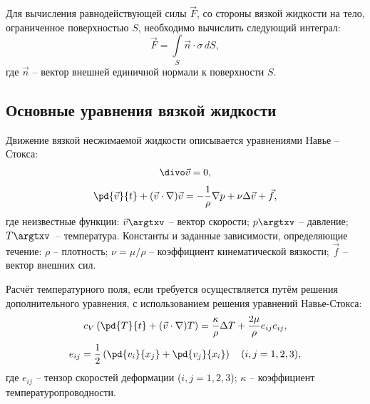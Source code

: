 \documentclass[14pt]{extarticle}
\begin{document}
Для вычисления равнодействующей силы $\vec{F}$, со стороны вязкой жидкости на тело, ограниченное поверхностью $S$, необходимо вычислить следующий интеграл:
\[
\vec{F} = \int\limits_S \vec{n} \cdot \sigma \, dS,
\]
где $\vec{n}$ -- вектор внешней единичной нормали к поверхности $S$.


\subsection{Основные уравнения вязкой жидкости}

Движение вязкой несжимаемой жидкости описывается \alert{уравнениями Навье -- Стокса}:
\begin{equation}
	\label{eq:navier–stokes_mass}
	\divo \vec{v} = 0,
\end{equation}
\begin{equation}
	\label{eq:navier–stokes}
	\pd{\vec{v}}{t} + (\vec{v}\cdot\nabla)\vec{v} = -\frac{1}{\rho}\nabla p + \nu \Delta \vec{v} + \vec{f},
\end{equation}
где \alert{неизвестные функции}: $\vec{v}\argtxv$ -- вектор скорости; $p\argtxv$ -- давление; $T\argtxv$~-- температура. \alert{Константы и заданные зависимости}, определяющие течение: $\rho$ -- плотность; $\nu=\mu/\rho$ -- коэффициент кинематической вязкости; $\vec{f}$ -- вектор внешних сил. 
		
Расчёт температурного поля, если требуется осуществляется путём решения дополнительного уравнения, с использованием решения уравнений Навье-Стокса:
\[
c_V\left(\pd{T}{t} + (\vec{v}\cdot\nabla)T \right) = \frac{\kappa}{\rho} \Delta T + \frac{2\mu}{\rho} e_{ij}e_{ij},
\]
\[
e_{ij} = \frac{1}{2}\left(
\pd{v_i}{x_j}+\pd{v_j}{x_i}
\right)\quad
(i,j = 1,2,3),
\]
где $e_{ij}$ -- тензор скоростей деформации ($i,j = 1,2,3$); $\kappa$ -- коэффициент температуропроводности.
\end{document}
